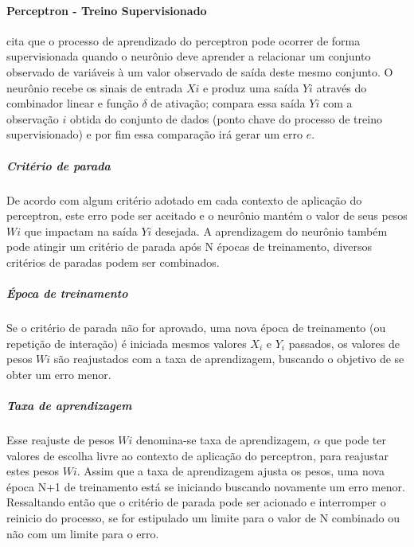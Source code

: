 \documentclass[	12pt, Times, openright, twoside, a4paper, english, brazil]{abntex2}
\begin{document}
		      \paragraph*{Perceptron - Treino Supervisionado}
            \cite{Almeida2013} cita que o processo de aprendizado do perceptron pode ocorrer de forma supervisionada quando o neurônio deve aprender a relacionar um conjunto observado de variáveis à um valor observado de saída deste mesmo conjunto. O neurônio recebe os sinais de entrada $Xi$ e produz uma saída $Yi$ através do combinador linear e função $\delta$ de ativação; compara essa saída $Yi$ com a observação $i$ obtida do conjunto de dados (ponto chave do processo de treino supervisionado) e por fim essa comparação irá gerar um erro $e$.
            
            \subparagraph*{Critério de parada}
            	De acordo com algum critério adotado em cada contexto de aplicação do perceptron, este erro pode ser aceitado e o neurônio mantém o valor de seus pesos $Wi$ que impactam na saída $Yi$ desejada. A aprendizagem do neurônio também pode atingir um critério de parada após N épocas de treinamento, diversos critérios de paradas  podem ser combinados.  
            	
            \subparagraph*{Época de treinamento}
            	Se o critério de parada não for aprovado, uma nova época de treinamento (ou repetição de interação) é iniciada mesmos valores $X_i$ e $Y_i$ passados, os valores de pesos $Wi$ são reajustados com a taxa de aprendizagem, buscando o objetivo de se obter um erro menor.
            	
            \subparagraph {Taxa de aprendizagem}
            	Esse reajuste de pesos $Wi$ denomina-se taxa de aprendizagem, $\alpha$ que pode ter valores de escolha livre ao contexto de aplicação do perceptron, para reajustar estes pesos $Wi$. Assim que a taxa de aprendizagem ajusta os pesos, uma nova época N+1 de treinamento está se iniciando buscando novamente um erro menor. Ressaltando então que o critério de parada pode ser acionado e interromper o reinicio do processo, se for estipulado um limite para o valor de N combinado ou não com um limite para o erro. 
            	
\end{document}

